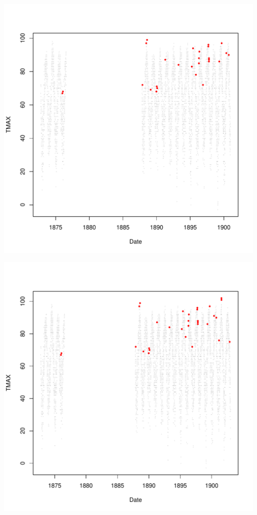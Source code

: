 \documentclass{article}\usepackage[]{graphicx}\usepackage[]{color}
\makeatletter
\def\maxwidth{ %
  \ifdim\Gin@nat@width>\linewidth
    \linewidth
  \else
    \Gin@nat@width
  \fi
}
\newenvironment{knitrout}{}{} %
\makeatother
\begin{document}
\begin{knitrout}
\includegraphics[width=\maxwidth]{figure/unnamed-chunk-4-10} 

\includegraphics[width=\maxwidth]{figure/unnamed-chunk-4-11} 


\end{knitrout}
\end{document}
